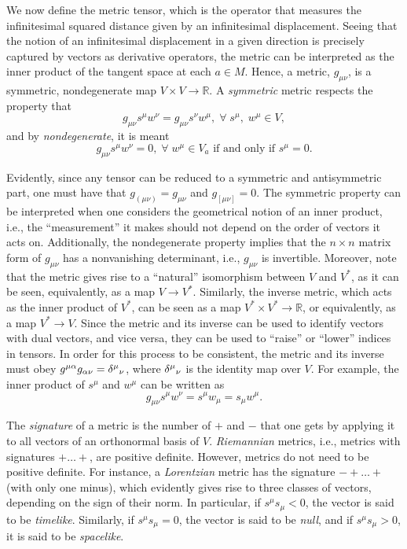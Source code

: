 \documentclass[
12pt,		%
openright,	%
twoside,  %
a4paper,			%
chapter=TITLE,		%
english,			%
french,				%
spanish,			%
brazil				%
]{USPSC-classe/USPSC}
\begin{document}
\begin{apendicesenv}
We now define the metric tensor, which is the operator that measures the infinitesimal squared distance given by an infinitesimal displacement. Seeing that the notion of an infinitesimal displacement in a given direction is precisely captured by vectors as derivative operators, the metric can be interpreted as the inner product of the tangent space at each $a\in M$. Hence, a metric, $g_{\mu\nu}$, is a symmetric, nondegenerate map $V\times V\to \mathbb{R}$. A \textit{symmetric} metric respects the property that 
\begin{equation}
    g_{\mu\nu}s^{\mu}w^{\nu}=g_{\mu\nu}s^{\nu}w^{\mu},\;\forall\;s^{\mu},\;w^{\mu}\in V,
\end{equation}
and by \textit{nondegenerate}, it is meant
\begin{equation}\label{deg}
    g_{\mu\nu}s^{\mu}w^{\nu}=0,\;\forall\;w^{\mu}\in V_a\text{ if and only if }s^{\mu}=0.
\end{equation}

Evidently, since any tensor can be reduced to a symmetric and antisymmetric part, one must have that $g_{(\mu\nu)}=g_{\mu\nu}$ and $g_{[\mu\nu]}=0$. The symmetric property can be interpreted when one considers the geometrical notion of an inner product, i.e., the ``measurement'' it makes should not depend on the order of vectors it acts on. Additionally, the nondegenerate property implies that the $n\times n$ matrix form of $g_{\mu\nu}$ has a nonvanishing determinant, i.e., $g_{\mu\nu}$ is invertible. Moreover, note that the metric gives rise to a ``natural'' isomorphism between $V$ and $V^*$, as it can be seen, equivalently, as a map $V\to V^*$. Similarly, the inverse metric, which acts as the inner product of $V^*$, can be seen as a map $V^*\times V^*\to\mathbb{R}$, or equivalently, as a map $V^*\to V$. Since the metric and its inverse can be used to identify vectors with dual vectors, and vice versa, they can be used to “raise” or “lower” indices in tensors. In order for this process to be consistent, the metric and its inverse must obey $g^{\mu\alpha}g_{\alpha\nu}=\delta^{\mu}\mathstrut_{\nu}$, where $\delta^{\mu}\mathstrut_{\nu}$ is the identity map over $V$. For example, the inner product of $s^{\mu}$ and $w^{\mu}$ can be written as
\begin{equation}
    g_{\mu\nu}s^{\mu}w^{\nu}=s^{\mu}w_{\mu}=s_{\mu}w^{\mu}.
\end{equation}

The \textit{signature} of a metric is the number of $+$ and $-$ that one gets by applying it to all vectors of an orthonormal basis of $V$. \textit{Riemannian} metrics, i.e., metrics with signatures $+\ldots+$, are positive definite. However, metrics do not need to be positive definite. For instance, a \textit{Lorentzian} metric has the signature $-+\ldots+$ (with only one minus), which evidently gives rise to three classes of vectors, depending on the sign of their norm. In particular, if $s^{\mu}s_{\mu}<0$, the vector is said to be \textit{timelike}. Similarly, if $s^{\mu}s_{\mu}=0$, the vector is said to be \textit{null}, and if $s^{\mu}s_{\mu}>0$, it is said to be \textit{spacelike}.


\end{apendicesenv}
\end{document}

